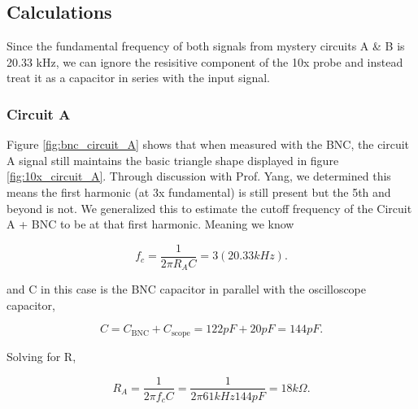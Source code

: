 \documentclass[12pt,letterpaper]{report}
\begin{document}
\subsection*{Calculations}
Since the fundamental frequency of both signals from mystery circuits A \& B is 20.33 kHz, we can ignore the resisitive component of the 10x probe and instead treat it as a capacitor in series with the input signal.

\subsubsection*{Circuit A}
Figure \ref{fig:bnc_circuit_A} shows that when measured with the BNC, the circuit A signal still maintains the basic triangle shape displayed in figure \ref{fig:10x_circuit_A}. Through discussion with Prof. Yang, we determined this means the first harmonic (at 3x fundamental) is still present but the 5th and beyond is not. We generalized this to estimate the cutoff frequency of the Circuit A + BNC to be at that first harmonic. Meaning we know

$$
f_c = \frac{1}{2 \pi R_A C} = 3(20.33 kHz).
$$

and C in this case is the BNC capacitor in parallel with the oscilloscope capacitor,

$$
C = C_{\text{BNC}} + C_{\text{scope}} = 122 pF + 20 pF = 144 pF.
$$

Solving for R,

$$
R_A =  \frac{1}{2 \pi f_c C} = \frac{1}{2 \pi 61kHz 144pF} = 18 k\Omega.
$$
\end{document}
